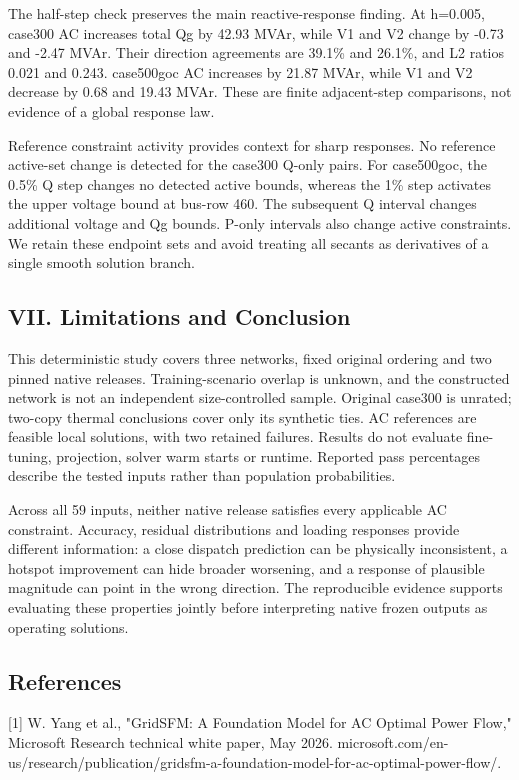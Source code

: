\documentclass[conference]{IEEEtran}
\begin{document}
The half-step check preserves the main reactive-response finding. At h=0.005, case300 AC increases total Qg by 42.93 MVAr, while V1 and V2 change by -0.73 and -2.47 MVAr. Their direction agreements are 39.1\% and 26.1\%, and L2 ratios 0.021 and 0.243. case500goc AC increases by 21.87 MVAr, while V1 and V2 decrease by 0.68 and 19.43 MVAr. These are finite adjacent-step comparisons, not evidence of a global response law.

Reference constraint activity provides context for sharp responses. No reference active-set change is detected for the case300 Q-only pairs. For case500goc, the 0.5\% Q step changes no detected active bounds, whereas the 1\% step activates the upper voltage bound at bus-row 460. The subsequent Q interval changes additional voltage and Qg bounds. P-only intervals also change active constraints. We retain these endpoint sets and avoid treating all secants as derivatives of a single smooth solution branch.

\subsection*{VII. Limitations and Conclusion}
This deterministic study covers three networks, fixed original ordering and two pinned native releases. Training-scenario overlap is unknown, and the constructed network is not an independent size-controlled sample. Original case300 is unrated; two-copy thermal conclusions cover only its synthetic ties. AC references are feasible local solutions, with two retained failures. Results do not evaluate fine-tuning, projection, solver warm starts or runtime. Reported pass percentages describe the tested inputs rather than population probabilities.

Across all 59 inputs, neither native release satisfies every applicable AC constraint. Accuracy, residual distributions and loading responses provide different information: a close dispatch prediction can be physically inconsistent, a hotspot improvement can hide broader worsening, and a response of plausible magnitude can point in the wrong direction. The reproducible evidence supports evaluating these properties jointly before interpreting native frozen outputs as operating solutions.

\subsection*{References}
[1] W. Yang et al., "GridSFM: A Foundation Model for AC Optimal Power Flow," Microsoft Research technical white paper, May 2026. microsoft.com/en-us/research/publication/gridsfm-a-foundation-model-for-ac-optimal-power-flow/.
\end{document}
